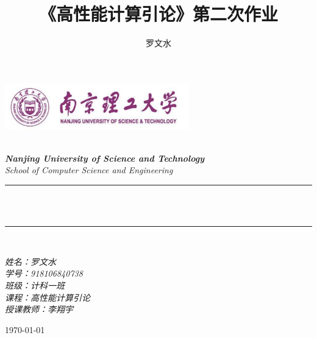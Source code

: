 \documentclass[12pt]{article}
\title{《高性能计算引论》第二次作业}
\author{\textup{罗文水}}
\begin{document}
	
	\begin{titlepage}
		\newcommand{\HRule}{\rule{\linewidth}{0.5mm}}
		\begin{center}
			\includegraphics[width=8cm]{../HPC_P1/title}			
		\end{center}
		
		\center 
		\quad\\[1.5cm]
		\textsl{\Large \textbf{Nanjing University of Science and Technology} }\\[0.5cm] 
		\textsl{\large School of Computer Science and Engineering}\\[0.5cm] 
		\makeatletter
		\HRule \\[0.4cm]
		{ \huge \bfseries \@title}\\[0.25cm] 
		\HRule \\[1.5cm]
	\begin{minipage}{0.42\textwidth}
		\begin{flushleft}
			
			\Large{\emph{姓名：罗文水}}
			\\
			\Large{\emph{学号：918106840738}}
			\\
			\Large{\emph{班级：计科一班}}
			\\
			\Large{\emph{课程：高性能计算引论}}
			\\
			\Large{\emph{授课教师：李翔宇}}
			\\
		\end{flushleft}
	\end{minipage}
		\vspace{7em} 
		
		{\large \today}\\[2cm] 
		\vfill 
	\end{titlepage}
	
	\newpage
\end{document}

